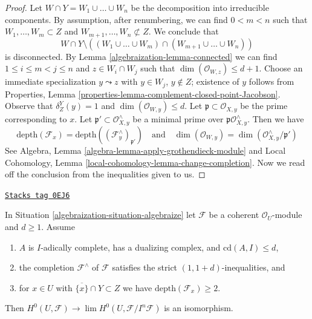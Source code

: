 \begin{proof}

Let $W \cap Y = W_1 \cup \ldots \cup W_n$ be the decomposition into
irreducible components. By assumption, after renumbering, we can find
$0 < m < n$ such that $W_1, \ldots, W_m  \subset Z$ and
$W_{m + 1}, \ldots, W_n \not \subset Z$. We conclude that
$$
W \cap Y \setminus
\left((W_1 \cup \ldots \cup W_m) \cap (W_{m + 1} \cup \ldots \cup W_n)\right)
$$
is disconnected. By Lemma \ref{algebraization-lemma-connected} we can find
$1 \leq i \leq m < j \leq n$ and
$z \in W_i \cap W_j$ such that $\dim(\mathcal{O}_{W, z}) \leq d + 1$.
Choose an immediate specialization $y \leadsto z$ with
$y \in W_j$, $y \not \in Z$; existence of $y$ follows from
Properties, Lemma \ref{properties-lemma-complement-closed-point-Jacobson}.
Observe that $\delta^Y_Z(y) = 1$ and $\dim(\mathcal{O}_{W, y}) \leq d$.
Let $\mathfrak p \subset \mathcal{O}_{X, y}$ be the prime corresponding to $x$.
Let $\mathfrak p' \subset \mathcal{O}_{X, y}^\wedge$ be a minimal prime
over $\mathfrak p\mathcal{O}_{X, y}^\wedge$. Then we have
$$
\text{depth}(\mathcal{F}_x) =
\text{depth}((\mathcal{F}^\wedge_y)_{\mathfrak p'})
\quad\text{and}\quad
\dim(\mathcal{O}_{W, y}) = \dim(\mathcal{O}_{X, y}^\wedge/\mathfrak p')
$$
See Algebra, Lemma \ref{algebra-lemma-apply-grothendieck-module} and
Local Cohomology, Lemma \ref{local-cohomology-lemma-change-completion}.
Now we read off the conclusion from the inequalities given to us.
\end{proof}

\begin{lemma}[Recover]
\label{algebraization-lemma-recover}
\href{https://stacks.math.columbia.edu/tag/0EJ6}{\texttt{Stacks tag 0EJ6}}

In Situation \ref{algebraization-situation-algebraize} let $\mathcal{F}$ be a
coherent $\mathcal{O}_U$-module and $d \geq 1$. Assume
\begin{enumerate}
\item $A$ is $I$-adically complete, has a dualizing complex, and
$\text{cd}(A, I) \leq d$,
\item the completion $\mathcal{F}^\wedge$ of $\mathcal{F}$
satisfies the strict $(1, 1+ d)$-inequalities, and
\item for $x \in U$ with $\overline{\{x\}} \cap Y \subset Z$
we have $\text{depth}(\mathcal{F}_x) \geq 2$.
\end{enumerate}
Then $H^0(U, \mathcal{F}) \to \lim H^0(U, \mathcal{F}/I^n\mathcal{F})$
is an isomorphism.
\end{lemma}

